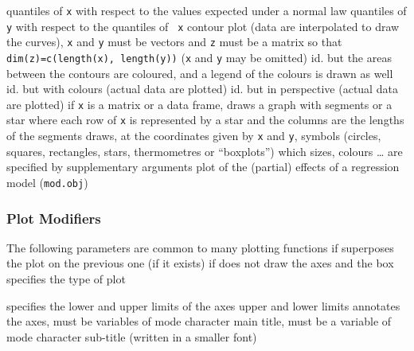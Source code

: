 	{quantiles of {\tt x} with respect to the values expected
under a normal law}
	{quantiles of {\tt y} with respect to the quantiles of {\tt
x}}
	{contour plot (data are interpolated to draw the
curves), {\tt x} and {\tt y} must be vectors and {\tt z} must be a matrix so
that {\tt dim(z)=c(length(x), length(y))} ({\tt x} and {\tt y} may be omitted)}
	{ id. but the areas between the contours are
coloured, and a legend of the colours is drawn as well}
	{ id. but with colours (actual data are plotted)}
	{ id. but in perspective (actual data are plotted)}
	{if {\tt x} is a matrix or a data frame, draws a graph with
segments or a star where each row of {\tt x} is represented by a star and the
columns are the lengths of the segments}
	{draws, at the coordinates given by {\tt x} and
{\tt y}, symbols (circles, squares, rectangles, stars, thermometres or
``boxplots'') which sizes, colours \ldots{} are specified by supplementary
arguments}
	{ plot of the (partial) effects of a regression
model ({\tt mod.obj})}

\subsubsection{Plot Modifiers}{The following parameters are common to many
    plotting functions}
	{if \T superposes the plot on the previous one (if it exists)}
	{if \F does not draw the axes and the box}
	{ specifies the type of plot}

	{specifies the lower and upper limits of the axes}
	{upper and lower limits}
	{ annotates the axes, must be variables of mode character}
	{ main title, must be a variable of mode character}
	{ sub-title (written in a smaller font)}

